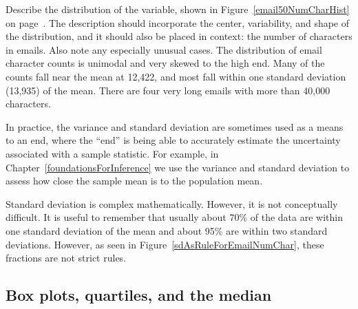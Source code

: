 \begin{example}{Describe the distribution of the  variable, shown in Figure~\ref{email50NumCharHist} on page~\pageref{email50NumCharHist}. The description should incorporate the center, variability, and shape of the distribution, and it should also be placed in context: the number of characters in emails. Also note any especially unusual cases.}
The distribution of email character counts is unimodal and very skewed to the high end. Many of the counts fall near the mean at 12,422, and most fall within one standard deviation (13,935) of the mean. There are four very long emails with more than 40,000 characters.
\end{example}

In practice, the variance and standard deviation are sometimes used as a means to an end, where the ``end'' is being able to accurately estimate the uncertainty associated with a sample statistic. For example, in Chapter~\ref{foundationsForInference} we use the variance and standard deviation to assess how close the sample mean is to the population mean.

\begin{tipBox}{
Standard deviation is complex mathematically. However, it is not conceptually difficult. It is useful to remember that usually about 70\% of the data are within one standard deviation of the mean and about 95\% are within two standard deviations. However, as seen in Figure~\ref{sdAsRuleForEmailNumChar}, these fractions are not strict rules.}
\end{tipBox}

\subsection{Box plots, quartiles, and the median}

